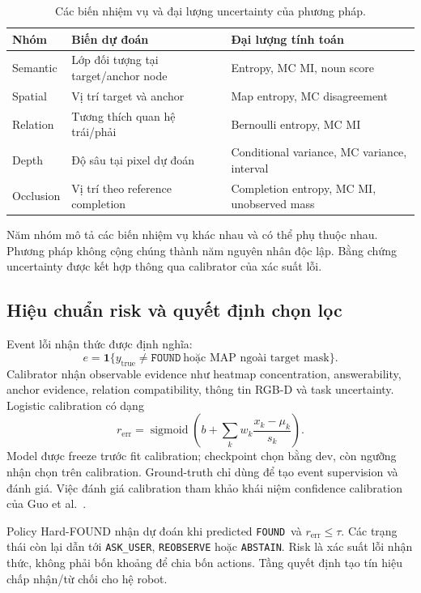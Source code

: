 \documentclass[12pt,a4paper]{article}
\newcommand{\FOUND}{\texttt{FOUND}}
\newcommand{\risk}{r_{\mathrm{err}}}
\begin{document}
\begin{table}[H]\centering\small
\caption{Các biến nhiệm vụ và đại lượng uncertainty của phương pháp.}
\begin{tabularx}{\linewidth}{p{2.2cm}Y Y}\toprule
Nhóm & Biến dự đoán & Đại lượng tính toán\\
\midrule
Semantic & Lớp đối tượng tại target/anchor node & Entropy, MC MI, noun score\\
Spatial & Vị trí target và anchor & Map entropy, MC disagreement\\
Relation & Tương thích quan hệ trái/phải & Bernoulli entropy, MC MI\\
Depth & Độ sâu tại pixel dự đoán & Conditional variance, MC variance, interval\\
Occlusion & Vị trí theo reference completion & Completion entropy, MC MI, unobserved mass\\
\bottomrule\end{tabularx}
\end{table}
Năm nhóm mô tả các biến nhiệm vụ khác nhau và có thể phụ thuộc nhau. Phương pháp không cộng chúng thành năm nguyên nhân độc lập. Bằng chứng uncertainty được kết hợp thông qua calibrator của xác suất lỗi.

\subsection{Hiệu chuẩn risk và quyết định chọn lọc}
Event lỗi nhận thức được định nghĩa:
\begin{equation}
e=\mathbf1\{y_{\mathrm{true}}\ne\FOUND\ \text{hoặc MAP ngoài target mask}\}.
\end{equation}
Calibrator nhận observable evidence như heatmap concentration, answerability, anchor evidence, relation compatibility, thông tin RGB-D và task uncertainty. Logistic calibration có dạng
\begin{equation}
\risk=\operatorname{sigmoid}\left(b+\sum_kw_k\frac{x_k-\mu_k}{s_k}\right).
\end{equation}
Model được freeze trước fit calibration; checkpoint chọn bằng dev, còn ngưỡng nhận chọn trên calibration. Ground-truth chỉ dùng để tạo event supervision và đánh giá. Việc đánh giá calibration tham khảo khái niệm confidence calibration của Guo et al.~\cite{guo2017}.

Policy Hard-FOUND nhận dự đoán khi predicted \FOUND\ và $\risk\le\tau$. Các trạng thái còn lại dẫn tới \texttt{ASK\_USER}, \texttt{REOBSERVE} hoặc \texttt{ABSTAIN}. Risk là xác suất lỗi nhận thức, không phải bốn khoảng để chia bốn actions. Tầng quyết định tạo tín hiệu chấp nhận/từ chối cho hệ robot.
\end{document}
